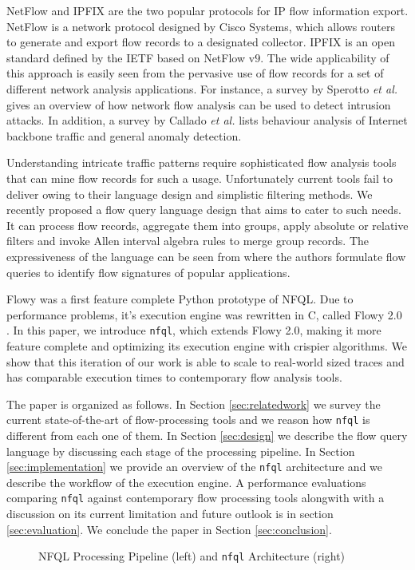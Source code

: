NetFlow and \ac{IPFIX} are the two popular protocols for IP flow information
export. NetFlow \cite{rfc3954} is a network protocol designed by Cisco
Systems, which allows routers to generate and export flow records to a
designated collector. \ac{IPFIX} \cite{rfc5101} is an open standard defined by
the IETF based on NetFlow v$9$. The wide applicability of this approach is
easily seen from the pervasive use of flow records for a set of different
network analysis applications. For instance, a survey by Sperotto \textit{et
al.} \cite{sperotto:2010} gives an overview of how network flow analysis can
be used to detect intrusion attacks. In addition, a survey by Callado
\textit{et al.} \cite{callado:2009} lists behaviour analysis of Internet
backbone traffic and general anomaly detection.

Understanding intricate traffic patterns require sophisticated flow analysis
tools that can mine flow records for such a usage.  Unfortunately current
tools fail to deliver owing to their language design and simplistic filtering
methods.  We recently proposed a flow query language design
\cite{vmarinov:2009} that aims to cater to such needs.  It can process flow
records, aggregate them into groups, apply absolute or relative filters and
invoke Allen interval algebra rules \cite{fallen:1983} to merge group records.
The expressiveness of the language can be seen from \cite{vperelman:2011}
where the authors formulate flow queries to identify flow signatures of
popular applications.

Flowy \cite{kkanev:2010} was a first feature complete Python prototype of
\ac{NFQL}. Due to performance problems, it's execution engine was rewritten in
C, called Flowy 2.0 \cite{jschauer:thesis:2011}. In this paper, we introduce
\texttt{nfql}, which extends Flowy 2.0, making it more feature complete and
optimizing its execution engine with crispier algorithms.  We show that this
iteration of our work is able to scale to real-world sized traces and has
comparable execution times to contemporary flow analysis tools.

The paper is organized as follows. In Section \ref{sec:relatedwork} we survey
the current state-of-the-art of flow-processing tools and we reason how
\texttt{nfql} is different from each one of them. In Section \ref{sec:design}
we describe the flow query language by discussing each stage of the processing
pipeline. In Section \ref{sec:implementation} we provide an overview of the
\texttt{nfql} architecture and we describe the workflow of the execution
engine. A performance evaluations comparing \texttt{nfql} against contemporary
flow processing tools alongwith with a discussion on its current limitation
and future outlook is in section \ref{sec:evaluation}. We conclude the paper
in Section \ref{sec:conclusion}.

\begin{figure*}[!t]
   \label{foo}
  \hfil {}
  \label{bar} \caption{NFQL Processing Pipeline \cite{vmarinov:2009} (left)
  and \texttt{nfql} Architecture (right)} \label{fig:nfql-pipeline}
\end{figure*}
